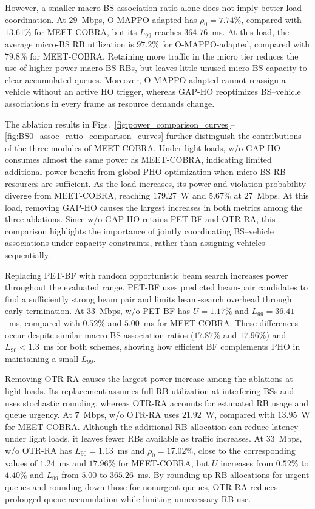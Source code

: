 \documentclass[conference, a4paper]{IEEEtran}
\newcommand{\rev}[1]{\textcolor{revisioncolor}{{}#1}}
\theoremstyle{remark}
\begin{document}
\rev{However, a smaller macro-BS association ratio alone does not imply better load coordination. At $29$~Mbps, O-MAPPO-adapted has $\rho_0=7.74\%$, compared with $13.61\%$ for MEET-COBRA, but its $L_{99}$ reaches $364.76$~ms. At this load, the average micro-BS RB utilization is $97.2\%$ for O-MAPPO-adapted, compared with $79.8\%$ for MEET-COBRA. Retaining more traffic in the micro tier reduces the use of higher-power macro-BS RBs, but leaves little unused micro-BS capacity to clear accumulated queues. Moreover, O-MAPPO-adapted cannot reassign a vehicle without an active HO trigger, whereas GAP-HO reoptimizes BS--vehicle associations in every frame as resource demands change.}

\rev{The ablation results in Figs.~\ref{fig:power_comparison_curves}--\ref{fig:BS0_assoc_ratio_comparison_curves} further distinguish the contributions of the three modules of MEET-COBRA. Under light loads, w/o GAP-HO consumes almost the same power as MEET-COBRA, indicating limited additional power benefit from global PHO optimization when micro-BS RB resources are sufficient. As the load increases, its power and violation probability diverge from MEET-COBRA, reaching $179.27$~W and $5.67\%$ at $27$~Mbps. At this load, removing GAP-HO causes the largest increases in both metrics among the three ablations. Since w/o GAP-HO retains PET-BF and OTR-RA, this comparison highlights the importance of jointly coordinating BS--vehicle associations under capacity constraints, rather than assigning vehicles sequentially.}

\rev{Replacing PET-BF with random opportunistic beam search increases power throughout the evaluated range. PET-BF uses predicted beam-pair candidates to find a sufficiently strong beam pair and limits beam-search overhead through early termination. At $33$~Mbps, w/o PET-BF has $U=1.17\%$ and $L_{99}=36.41$~ms, compared with $0.52\%$ and $5.00$~ms for MEET-COBRA. These differences occur despite similar macro-BS association ratios ($17.87\%$ and $17.96\%$) and $L_{90}<1.3$~ms for both schemes, showing how efficient BF complements PHO in maintaining a small $L_{99}$.}

\rev{Removing OTR-RA causes the largest power increase among the ablations at light loads. Its replacement assumes full RB utilization at interfering BSs and uses stochastic rounding, whereas OTR-RA accounts for estimated RB usage and queue urgency. At $7$~Mbps, w/o OTR-RA uses $21.92$~W, compared with $13.95$~W for MEET-COBRA. Although the additional RB allocation can reduce latency under light loads, it leaves fewer RBs available as traffic increases. At $33$~Mbps, w/o OTR-RA has $L_{90}=1.13$~ms and $\rho_0=17.02\%$, close to the corresponding values of $1.24$~ms and $17.96\%$ for MEET-COBRA, but $U$ increases from $0.52\%$ to $4.40\%$ and $L_{99}$ from $5.00$ to $365.26$~ms. By rounding up RB allocations for urgent queues and rounding down those for nonurgent queues, OTR-RA reduces prolonged queue accumulation while limiting unnecessary RB use.}
\end{document}
